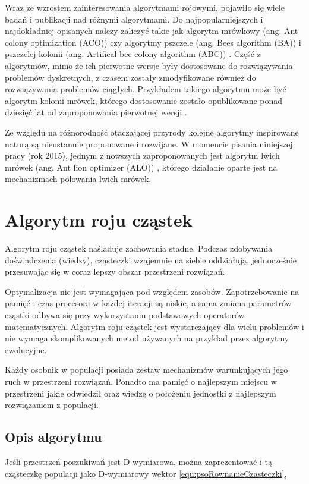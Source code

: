Wraz ze wzrostem zainteresowania algorytmami rojowymi, pojawiło się wiele badań i publikacji nad różnymi algorytmami. Do najpopularniejszych i najdokładniej opisanych należy zaliczyć takie jak algorytm mrówkowy (ang. Ant colony optimization (ACO)) \cite{ACO} czy algorytmy pszczele (ang. Bees algorithm (BA)) \cite{BA} i pszczelej kolonii (ang. Artifical bee colony algorithm (ABC)) \cite{ABC}. Część z algorytmów, mimo że ich pierwotne wersje były dostosowane do rozwiązywania problemów dyskretnych, z czasem zostały zmodyfikowane również do rozwiązywania problemów ciągłych. Przykładem takiego algorytmu może być algorytm kolonii mrówek, którego dostosowanie zostało opublikowane ponad dziesięć lat od zaproponowania pierwotnej wersji \cite{ACO2}. 

Ze względu na różnorodność otaczającej przyrody kolejne algorytmy inspirowane naturą są nieustannie proponowane i rozwijane. W momencie pisania niniejszej pracy (rok 2015), jednym z nowszych zaproponowanych jest algorytm lwich mrówek (ang. Ant lion optimizer (ALO)) \cite{ALO}, którego działanie oparte jest na mechanizmach polowania lwich mrówek.

\section{Algorytm roju cząstek}
\label{sec:psoOpis}
Algorytm roju cząstek naśladuje zachowania stadne. Podczas zdobywania doświadczenia (wiedzy), cząsteczki wzajemnie na siebie oddziałują, jednocześnie przesuwając się w coraz lepszy obszar przestrzeni rozwiązań. 

Optymalizacja nie jest wymagająca pod względem zasobów. Zapotrzebowanie na pamięć i czas procesora w każdej iteracji są niskie, a sama zmiana parametrów cząstki odbywa się przy wykorzystaniu podstawowych operatorów matematycznych. Algorytm roju cząstek jest wystarczający dla wielu problemów i nie wymaga skomplikowanych metod używanych na przykład przez algorytmy ewolucyjne.

Każdy osobnik w populacji posiada zestaw mechanizmów warunkujących jego ruch w przestrzeni rozwiązań. Ponadto ma pamięć o najlepszym miejscu w przestrzeni jakie odwiedził oraz wiedzę o położeniu jednostki z najlepszym rozwiązaniem z populacji.

\subsection*{Opis algorytmu}
\label{sec:psoRownania}
Jeśli przestrzeń poszukiwań jest D-wymiarowa, można zaprezentować i-tą cząsteczkę populacji jako D-wymiarowy wektor \ref{equ:psoRownanieCzasteczki},

